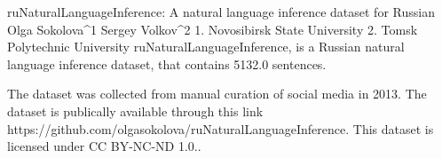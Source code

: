 
ruNaturalLanguageInference: A natural language inference dataset for Russian
Olga Sokolova^1 Sergey Volkov^2
1. Novosibirsk State University 2. Tomsk Polytechnic University
ruNaturalLanguageInference, is a Russian natural language inference dataset, that contains 5132.0 sentences.

The dataset was collected from manual curation of social media in 2013. 
The dataset is publically available through this link https://github.com/olgasokolova/ruNaturalLanguageInference. This dataset is licensed under CC BY-NC-ND 1.0..


